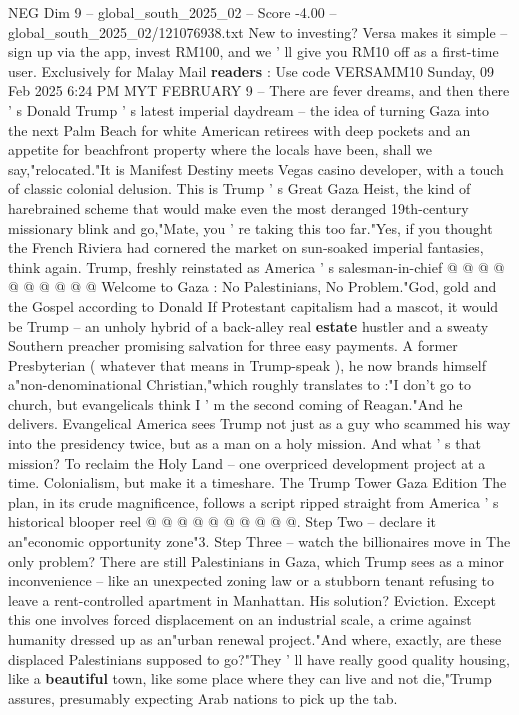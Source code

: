 \begin{textsample}{NEG Dim 9 – global\_south\_2025\_02 – Score -4.00 – global\_south\_2025\_02/121076938.txt}  \label{ex:f9_neg_062}
New to investing?
Versa makes it simple -- sign up via the app, invest RM100, and we ' ll give you RM10 off as a first-time user.
Exclusively for Malay Mail \textbf{readers} : Use code VERSAMM10 Sunday, 09 Feb 2025 6:24 PM MYT FEBRUARY 9 -- There are fever dreams, and then there ' s Donald Trump ' s latest imperial daydream -- the idea of turning Gaza into the next Palm Beach for white American retirees with deep pockets and an appetite for beachfront property where the locals have been, shall we say,"relocated."It is Manifest Destiny meets Vegas casino developer, with a touch of classic colonial delusion.
This is Trump ' s Great Gaza Heist, the kind of harebrained scheme that would make even the most deranged 19th-century missionary blink and go,"Mate, you ' re taking this too far."Yes, if you thought the French Riviera had cornered the market on sun-soaked imperial fantasies, think again.
Trump, freshly reinstated as America ' s salesman-in-chief @ @ @ @ @ @ @ @ @ @ Welcome to Gaza : No Palestinians, No Problem."God, gold and the Gospel according to Donald If Protestant capitalism had a mascot, it would be Trump -- an unholy hybrid of a back-alley real \textbf{estate} hustler and a sweaty Southern preacher promising salvation for three easy payments.
A former Presbyterian ( whatever that means in Trump-speak ), he now brands himself a"non-denominational Christian,"which roughly translates to :"I don't go to church, but evangelicals think I ' m the second coming of Reagan."And he delivers.
Evangelical America sees Trump not just as a guy who scammed his way into the presidency twice, but as a man on a holy mission.
And what ' s that mission?
To reclaim the Holy Land -- one overpriced development project at a time.
Colonialism, but make it a timeshare.
The Trump Tower Gaza Edition The plan, in its crude magnificence, follows a script ripped straight from America ' s historical blooper reel @ @ @ @ @ @ @ @ @ @.
Step Two -- declare it an"economic opportunity zone"3.
Step Three -- watch the billionaires move in The only problem?
There are still Palestinians in Gaza, which Trump sees as a minor inconvenience -- like an unexpected zoning law or a stubborn tenant refusing to leave a rent-controlled apartment in Manhattan.
His solution?
Eviction.
Except this one involves forced displacement on an industrial scale, a crime against humanity dressed up as an"urban renewal project."And where, exactly, are these displaced Palestinians supposed to go?"They ' ll have really good quality housing, like a \textbf{beautiful} town, like some place where they can live and not die,"Trump assures, presumably expecting Arab nations to pick up the tab.

\end{textsample}
